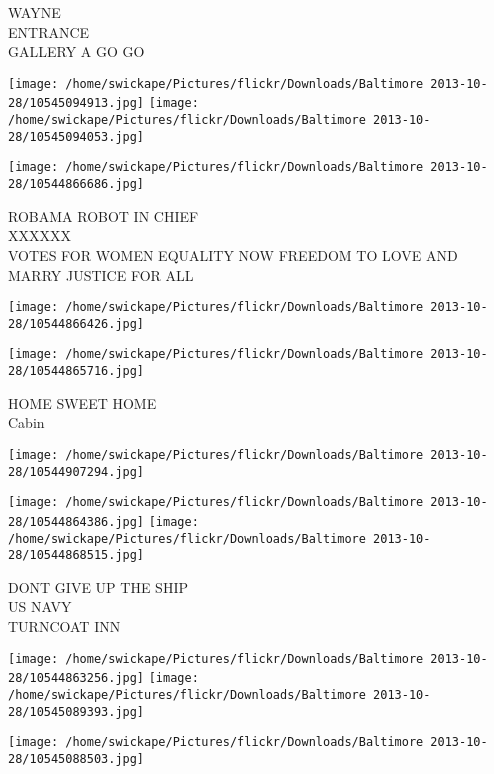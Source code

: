 \documentclass[10pt,letterpaper]{article}
\begin{document}
WAYNE\\
ENTRANCE\\
GALLERY A GO GO\\
\pagebreak

\texttt{[image: /home/swickape/Pictures/flickr/Downloads/Baltimore 2013-10-28/10545094913.jpg]}
\texttt{[image: /home/swickape/Pictures/flickr/Downloads/Baltimore 2013-10-28/10545094053.jpg]}

\vspace{0.25in}
\texttt{[image: /home/swickape/Pictures/flickr/Downloads/Baltimore 2013-10-28/10544866686.jpg]}

ROBAMA ROBOT IN CHIEF\\
XXXXXX\\
VOTES FOR WOMEN EQUALITY NOW FREEDOM TO LOVE AND MARRY JUSTICE FOR ALL\\
\pagebreak

\texttt{[image: /home/swickape/Pictures/flickr/Downloads/Baltimore 2013-10-28/10544866426.jpg]}

\vspace{0.25in}
\texttt{[image: /home/swickape/Pictures/flickr/Downloads/Baltimore 2013-10-28/10544865716.jpg]}

HOME SWEET HOME\\
Cabin\\
\pagebreak

\texttt{[image: /home/swickape/Pictures/flickr/Downloads/Baltimore 2013-10-28/10544907294.jpg]}

\vspace{0.25in}
\texttt{[image: /home/swickape/Pictures/flickr/Downloads/Baltimore 2013-10-28/10544864386.jpg]}
\texttt{[image: /home/swickape/Pictures/flickr/Downloads/Baltimore 2013-10-28/10544868515.jpg]}

DONT GIVE UP THE SHIP\\
US NAVY\\
TURNCOAT INN\\
\pagebreak

\texttt{[image: /home/swickape/Pictures/flickr/Downloads/Baltimore 2013-10-28/10544863256.jpg]}
\texttt{[image: /home/swickape/Pictures/flickr/Downloads/Baltimore 2013-10-28/10545089393.jpg]}

\texttt{[image: /home/swickape/Pictures/flickr/Downloads/Baltimore 2013-10-28/10545088503.jpg]}
\end{document}
